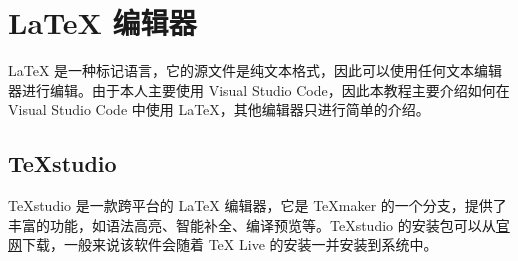 \section{LaTeX 编辑器}

LaTeX 是一种标记语言，它的源文件是纯文本格式，因此可以使用任何文本编辑器进行编辑。由于本人主要使用 Visual Studio Code，因此本教程主要介绍如何在 Visual Studio Code 中使用 LaTeX，其他编辑器只进行简单的介绍。

\subsection{TeXstudio}

TeXstudio 是一款跨平台的 LaTeX 编辑器，它是 TeXmaker 的一个分支，提供了丰富的功能，如语法高亮、智能补全、编译预览等。TeXstudio 的安装包可以从\href{https://www.texstudio.org/}{官网}下载，一般来说该软件会随着 TeX Live 的安装一并安装到系统中。

